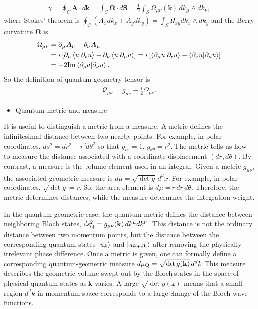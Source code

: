 \documentclass[12pt, oneside]{article}
\newcommand{\pa}{\partial}
\newcommand{\mr}[1]{\mathrm{#1}}
\newcommand{\p}[1]{\left(#1\right)}
\newcommand{\bb}[1]{\left[#1\right]}
\numberwithin{equation}{subsection}
\begin{document}
\begin{align}
	\gamma = \oint_{C} \bm{A} \cdot d \bm{k} = \int_{S} \bm{\Omega} \cdot d \bm{S}= \frac12 \int_S \Omega_{\mu\nu}(\mathbf k)\, dk_\mu\wedge dk_\nu,
\end{align}
where Stokes' theorem is \(\oint_C(A_xdk_x+A_ydk_y)=\int_S\Omega_{xy}dk_x\wedge dk_y\) and the Berry curvature \(\bm{\Omega}\) is 
\begin{align}
	\begin{split}
		\Omega_{\mu \nu} & = \partial_\mu \bm{A}_\nu - \partial_\nu \bm{A}_\mu \\
		& = i \bb{\pa_\mu \braket{ u | \pa_\nu u} - \pa_\nu \braket{u | \pa_\mu u}}  = i \bb{\braket{\pa_\mu u | \pa_\nu u} - \braket{\pa_\nu u | \pa_\mu u}} \\
		& = - 2 \mr{Im} \braket{\pa_\mu u | \pa_\nu u}.
	\end{split}
\end{align}
So the definition of quantum geometry tensor is
\begin{align}
	\boxed{
		\mathcal{Q}_{\mu \nu} = g_{\mu \nu} - \frac{i}{2} \Omega_{\mu \nu}.
	}
\end{align}

\begin{itemize}
	\item Quantum metric and measure
\end{itemize}

It is useful to distinguish a metric from a measure. A metric defines the infinitesimal distance between two nearby points. For example, in polar coordinates, \(ds^2 = dr^2 + r^2 d\theta^2\) so that \(g_{rr}=1, \, g_{\theta\theta}=r^2\). The metric tells us how to measure the distance associated with a coordinate displacement \((dr,d\theta)\). By contrast, a measure is the volume element used in an integral.  Given a metric \(g_{\mu\nu}\), the associated geometric measure is \(d\mu = \sqrt{\det g}\,d^d x \). For example, in polar coordinates, \(\sqrt{\det g}=r\). So, the area element is \(d\mu = r\,dr\,d\theta\). Therefore, the metric determines distances, while the measure determines the integration weight.

In the quantum-geometric case, the quantum metric defines the distance between neighboring Bloch states, \(ds_{\rm Q}^2 = g_{\mu\nu}(\mathbf k)\,dk^\mu dk^\nu\). This distance is not the ordinary distance between two momentum points, but the distance between the corresponding quantum states \(\ket{u_{\bm{k}}}\) and \(\ket{u_{\bm{k} + d \bm{k}}}\) after removing the physically irrelevant phase difference. Once a metric is given, one can formally define a corresponding quantum-geometric measure \(d\mu_{\rm Q} = \sqrt{\det g(\mathbf k)}\,d^d k\)
This measure describes the geometric volume swept out by the Bloch states in the space of physical quantum states as \(\bm{k}\) varies. 
A large \(\sqrt{\det g\p{\bm{k}}}\) means that a small region \(d^d k\) in momentum space corresponds to a large change of the Bloch wave functions. 
\end{document}

